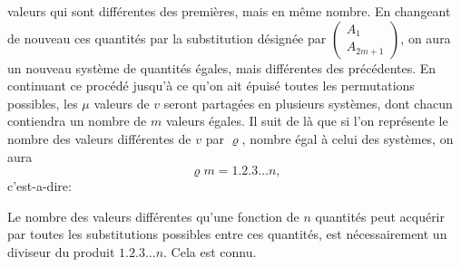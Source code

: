 \documentclass[oneside, 12 pt, leqno]{memoir}
\begin{document}
valeurs qui sont différentes des premières, mais en même nombre. En changeant de nouveau ces quantités par la substitution désignée par \(\left(\begin{array}{l}A_1 \\ A_{2 m+1}\end{array}\right)\), on aura un nouveau système de quantités égales, mais différentes des précédentes. En continuant ce procédé jusqu’à ce qu'on ait épuisé toutes les permutations possibles, les \(\mu\) valeurs de \(v\) seront partagées en plusieurs systèmes, dont chacun contiendra un nombre de \(m\) valeurs égales. Il suit de là que si l'on représente le nombre des valeurs différentes de \(v\) par \(\varrho\), nombre égal à celui des systèmes, on aura
\[\varrho m=1.2.3 \dots n,\]
c'est-a-dire:

Le nombre des valeurs différentes qu'une fonction de \(n\) quantités peut acquérir par toutes les substitutions possibles entre ces quantités, est nécessairement un diviseur du produit \(1.2.3\dots n\). Cela est connu.
\end{document}
